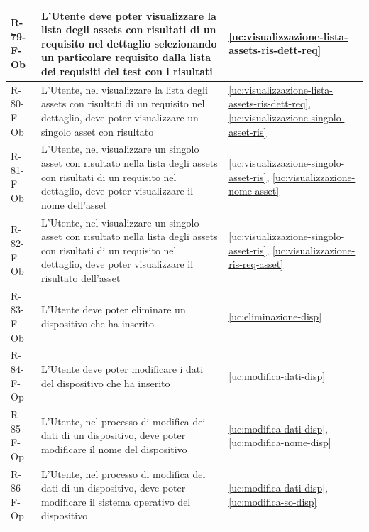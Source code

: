 ﻿\documentclass[a4paper,12pt]{article}
\begin{document}
{{\begin{longtable}{|l|p{}|p{}|}
            R-79-F-Ob       & L'Utente deve poter visualizzare la lista degli assets con risultati di un requisito nel dettaglio selezionando un particolare requisito dalla lista dei requisiti del test con i risultati & \ref{uc:visualizzazione-lista-assets-ris-dett-req}                                               \\ \hline
            R-80-F-Ob       & L'Utente, nel visualizzare la lista degli assets con risultati di un requisito nel dettaglio, deve poter visualizzare un singolo asset con risultato                                        & \ref{uc:visualizzazione-lista-assets-ris-dett-req}, \ref{uc:visualizzazione-singolo-asset-ris}                 \\ \hline
            R-81-F-Ob       & L'Utente, nel visualizzare un singolo asset con risultato nella lista degli assets con risultati di un requisito nel dettaglio, deve poter visualizzare il nome dell'asset                  & \ref{uc:visualizzazione-singolo-asset-ris}, \ref{uc:visualizzazione-nome-asset}             \\ \hline
            R-82-F-Ob       & L'Utente, nel visualizzare un singolo asset con risultato nella lista degli assets con risultati di un requisito nel dettaglio, deve poter visualizzare il risultato dell'asset             & \ref{uc:visualizzazione-singolo-asset-ris}, \ref{uc:visualizzazione-ris-req-asset}         \\ \hline
            R-83-F-Ob       & L'Utente deve poter eliminare un dispositivo che ha inserito                                                                                                                                & \ref{uc:eliminazione-disp}                                               \\ \hline
            R-84-F-Op       & L'Utente deve poter modificare i dati del dispositivo che ha inserito                                                                                                                       & \ref{uc:modifica-dati-disp}                                               \\ \hline
            R-85-F-Op       & L'Utente, nel processo di modifica dei dati di un dispositivo, deve poter modificare il nome del dispositivo                                                                                & \ref{uc:modifica-dati-disp}, \ref{uc:modifica-nome-disp}                 \\ \hline
            R-86-F-Op       & L'Utente, nel processo di modifica dei dati di un dispositivo, deve poter modificare il sistema operativo del dispositivo                                                                   & \ref{uc:modifica-dati-disp}, \ref{uc:modifica-so-disp}                 \\ \hline

\end{longtable}}}
\end{document}
